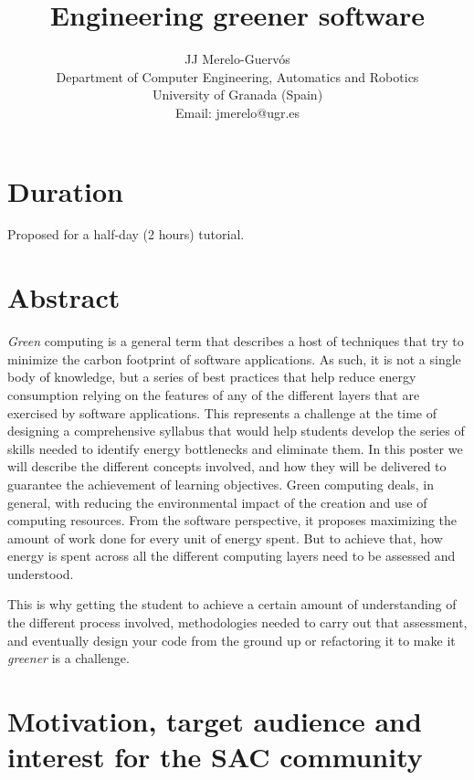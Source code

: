 \documentclass[a4paper]{article}
\begin{document}
\title{Engineering greener software}

\author{JJ Merelo-Guervós\\
  Department of Computer Engineering, Automatics and Robotics\\
  University of Granada (Spain)\\
  Email: {\sf jmerelo@ugr.es} }


\maketitle

\section{Duration}

Proposed for a half-day (2 hours) tutorial.

\section{Abstract}

{\em Green} computing is a general term that describes a host of techniques that
try to minimize the carbon footprint of software applications. As such, it is
not a single body of knowledge, but a series of best practices that help reduce
energy consumption relying on the features of any of the different layers that
are exercised by software applications. This represents a challenge at the
time of designing a comprehensive syllabus that would help students develop the
series of skills needed to identify energy bottlenecks and eliminate them. In
this poster we will describe the different concepts involved, and how they will
be delivered to guarantee the achievement of learning objectives.
Green computing \cite{kurp2008green} deals, in general, with reducing the
environmental impact of the creation and use of computing resources. From the
software perspective, it proposes maximizing the amount of work done for every
unit of energy spent. But to achieve that, how energy is spent across
all the different computing layers need to be assessed and understood.

This is why getting the student to achieve a certain amount of understanding of
the different process involved, methodologies needed to carry out that
assessment, and eventually design your code from the ground up or refactoring it
to make it {\em greener} is a challenge.

\section{Motivation, target audience and interest for the SAC community}
\end{document}
